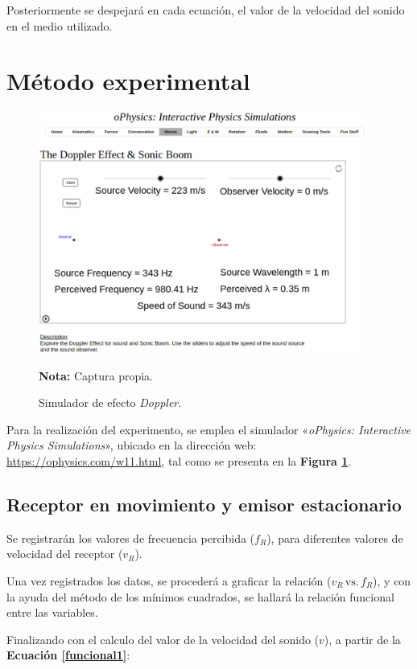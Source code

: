 \documentclass[letter,11pt]{article}
\newcommand{\source}[1]{\vspace{-11pt} \caption*{\small{\textbf{Nota:} {#1}}}}
\begin{document}
Posteriormente se despejará en cada ecuación, el valor de la velocidad del
sonido en el medio utilizado.

\section{Método experimental}

\begin{figure}
\centering
\includegraphics[width=0.96\textwidth]{resources/f4.eps}
\caption{Simulador de efecto \emph{Doppler}.}
\label{figura4}
\source{Captura propia.}
\end{figure}

Para la realización del experimento, se emplea el simulador «\emph{oPhysics:
Interactive Physics Simulations}», ubicado en la dirección web:
\url{https://ophysics.com/w11.html}, tal como se presenta en la
\textbf{Figura \ref{figura4}}.

\subsection{Receptor en movimiento y emisor estacionario}

Se registrarán los valores de frecuencia percibida ($f_R$), para diferentes
valores de velocidad del receptor ($v_R$).

Una vez registrados los datos, se procederá a graficar la relación
($v_R\,\text{vs.}\,f_R$), y con la ayuda del método de los mínimos cuadrados, se
hallará la relación funcional entre las variables.

Finalizando con el calculo del valor de la velocidad del sonido ($v$), a partir
de la \textbf{Ecuación \ref{funcional1}}:
\end{document}
